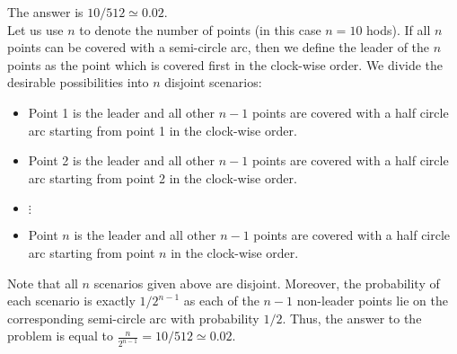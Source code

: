 \begin{solution}
The answer is $10/512 \simeq 0.02$.\\[0.2cm]

Let us use $n$ to denote the number of points (in this case $n = 10$ hods). If all $n$ points can be covered with a semi-circle arc, then we define the leader of the $n$ points as the point which is covered first in the clock-wise order. We divide the desirable possibilities into $n$ disjoint scenarios:

\begin{itemize}
	\item Point 1 is the leader and all other $n-1$ points are covered with a half circle arc starting from point 1 in the clock-wise order.
	\item Point 2 is the leader and all other $n-1$ points are covered with a half circle arc starting from point 2 in the clock-wise order.
	\item $\vdots$
	\item Point $n$ is the leader and all other $n-1$ points are covered with a half circle arc starting from point $n$ in the clock-wise order.
\end{itemize}

Note that all $n$ scenarios given above are disjoint. Moreover, the probability of each scenario is exactly $1/2^{n-1}$ as each of the $n-1$ non-leader points lie on the corresponding semi-circle arc with probability $1/2$. Thus, the answer to the problem is equal to $\frac{n}{2^{n-1}} = 10/512 \simeq 0.02$.
\end{solution}
